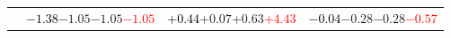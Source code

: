 \documentclass[compress]{beamer}
\begin{document}
\begin{frame}
\begin{tabular}{r | c | c | c}
          & \textcolor{black}{$-1.38$}\hspace{0.1 cm}$-1.05$\hspace{0.1 cm}$-1.05$\hspace{0.1 cm}\textcolor{red}{$-1.05$} & \textcolor{black}{$+0.44$}\hspace{0.1 cm}$+0.07$\hspace{0.1 cm}$+0.63$\hspace{0.1 cm}\textcolor{red}{$+4.43$} & \textcolor{black}{$-0.04$}\hspace{0.1 cm}$-0.28$\hspace{0.1 cm}$-0.28$\hspace{0.1 cm}\textcolor{red}{$-0.57$} \\
\end{tabular}
\end{frame}
\end{document}
